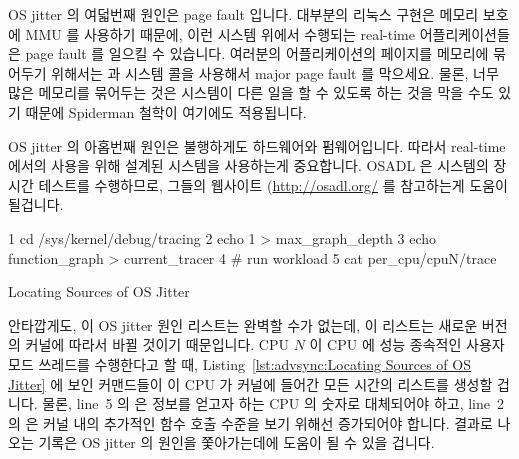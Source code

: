 OS jitter 의 여덟번째 원인은 page fault 입니다.
대부분의 리눅스 구현은 메모리 보호에 MMU 를 사용하기 때문에, 이런 시스템 위에서
수행되는 real-time 어플리케이션들은 page fault 를 일으킬 수 있습니다.
여러분의 어플리케이션의 페이지를 메모리에 묶어두기 위해서는  과
 시스템 콜을 사용해서 major page fault 를 막으세요.
물론, 너무 많은 메모리를 묶어두는 것은 시스템이 다른 일을 할 수 있도록 하는
것을 막을 수도 있기 때문에 Spiderman 철학이 여기에도 적용됩니다.

OS jitter 의 아홉번째 원인은 불행하게도 하드웨어와 펌웨어입니다.
따라서 real-time 에서의 사용을 위해 설계된 시스템을 사용하는게 중요합니다.
OSADL 은 시스템의 장시간 테스트를 수행하므로, 그들의 웹사이트
(\url{http://osadl.org/} 를 참고하는게 도움이 될겁니다.

\begin{listing}[tb]
{ \scriptsize
\begin{verbbox}
 1 cd /sys/kernel/debug/tracing
 2 echo 1 > max_graph_depth
 3 echo function_graph > current_tracer
 4 # run workload
 5 cat per_cpu/cpuN/trace
\end{verbbox}
}
\centering
\theverbbox
\caption{Locating Sources of OS Jitter}
\label{lst:advsync:Locating Sources of OS Jitter}
\end{listing}

안타깝게도, 이 OS jitter 원인 리스트는 완벽할 수가 없는데, 이 리스트는 새로운
버전의 커널에 따라서 바뀔 것이기 때문입니다.
CPU $N$ 이 CPU 에 성능 종속적인 사용자 모드 쓰레드를 수행한다고 할 때,
Listing~\ref{lst:advsync:Locating Sources of OS Jitter}
에 보인 커맨드들이 이 CPU 가 커널에 들어간 모든 시간의 리스트를 생성할 겁니다.
물론, line~5 의  은 정보를 얻고자 하는 CPU 의 숫자로 대체되어야 하고,
line~2 의  은 커널 내의 추가적인 함수 호출 수준을 보기 위해선 증가되어야
합니다.
결과로 나오는 기록은 OS jitter 의 원인을 쫓아가는데에 도움이 될 수 있을 겁니다.

